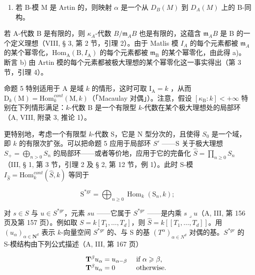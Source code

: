 \begin{enumerate}
\def\labelenumi{\alph{enumi})}
\setcounter{enumi}{1}
\tightlist
\item
  若 B-模 M 是 Artin 的，则映射 \(\alpha\) 是一个从 \(D_{B}(M)\) 到 \(D_{A}(M)\) 上的 B-同构。
\end{enumerate}

若 A-代数 B 是有限的，则 \(\kappa_{A}\)-代数 \(B/\mathfrak{m}_{A}B\) 也是有限的，这蕴含 \(\mathfrak{m}_{A}B\) 是 B 的一个定义理想（VIII, § 3, 第 2 节，引理 2）。由于 Matlis 模 \(I_{A}\) 的每个元素都被 \(\mathfrak{m}_{A}\) 的某个幂零化，\(\mathrm{Hom}_{\mathrm{A}}(\mathrm{B}, I_{\mathrm{A}})\) 的每个元素都被 \(\mathfrak{m}_{\mathrm{B}}\) 的某个幂零化，由此得 a)。断言 b) 由 Artin 模的每个元素都被极大理想的某个幂零化这一事实得出（第 3 节，引理 4）。

命题 5 特别适用于 A 是域 \(k\) 的情形，这时可取 \(\mathrm{I}_{\mathrm{A}} = k\) ，从而 \(\mathrm{D}_{k}(\mathrm{M}) = \mathrm{Hom}_{k}^{cont}(\mathrm{M}, k)\)（「Macaulay 对偶」）。注意，假设 \([\kappa_{\mathrm{B}} : k] < +\infty\) 特别在下列情形满足：\(k\)-代数 B 是一个有限型 \(k\)-代数在某个极大理想处的局部环（A, VIII, 附录 3, 推论 1）。

更特别地，考虑一个有限型 \(k\)-代数 S，它是 N 型分次的，且使得 \(S_0\) 是一个域，即 \(k\) 的有限次扩张。可以把命题 5 应用于局部环 \(S'\) ——S 关于极大理想 \(S_+ = \bigoplus_{n > 0} S_n\) 的局部环——或者等价地，应用于它的完备化 \(\widehat{S} = \prod_{n \geqslant 0} S_n\)（III, § 1, 第 3 节，引理 2 及 § 2, 第 12 节，例 1）。此时 S-模 \(I_{\widehat{S}} = \text{Hom}_k^{cont}(\widehat{S}, k)\) 等同于

\[
\mathrm{S} ^ {* \mathrm{gr}} = \bigoplus_ {n \geqslant 0} \operatorname{Hom} _ {k} (\mathrm{S} _ {n}, k) ;
\]

对 \(s \in S\) 与 \(u \in S^{*gr}\)，元素 \(su\) ——它属于 \(S^{*gr}\) ——是内乘 \(s \lrcorner u\)（A, III, 第 156 页及第 157 页）。例如取 \(S = k[T_1, \ldots, T_d]\)，则 \(\widehat{S} = k[[T_1, \ldots, T_d]]\)。用 \((u_\alpha)_{\alpha \in \mathbf{N}^d}\) 表示 \(k\)-向量空间 \(S^{*gr}\) 的、与 S 的基 \((T^\alpha)_{\alpha \in N^d}\) 对偶的基。\(S^{*gr}\) 的 S-模结构由下列公式描述（A, III, 第 167 页）

\[
\begin{array}{l l} \mathbf {T} ^ {\beta} u _ {\alpha} = u _ {\alpha - \beta} & \text { if } \alpha \geqslant \beta , \\ \mathbf {T} ^ {\beta} u _ {\alpha} = 0 & \text { otherwise. } \end{array}
\]
